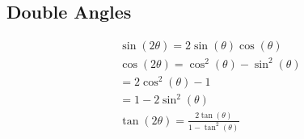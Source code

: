 \documentclass[12pt letter]{report}
\begin{document}
\subsection{Double Angles}
\begin{align*}
	\sin(2\theta) = 2\sin(\theta) \cos(\theta)      \\
	\cos(2\theta) = \cos^2(\theta) - \sin^2(\theta) \\
	= 2\cos^2(\theta) - 1                           \\
	= 1- 2 \sin^2(\theta)                           \\
	\tan(2\theta)= \frac{2\tan(\theta)}{1 - \tan^2(\theta)}
\end{align*}
\end{document}
